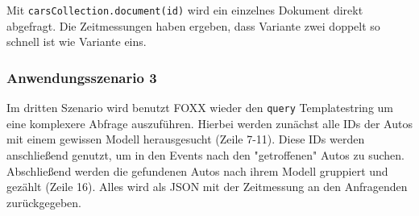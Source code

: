  Mit \texttt{carsCollection.document(id)} wird ein einzelnes Dokument direkt abgefragt. Die Zeitmessungen haben ergeben, dass Variante zwei doppelt so schnell ist wie Variante eins.

\subsubsection{Anwendungsszenario 3}
Im dritten Szenario wird benutzt FOXX wieder den \texttt{query} Templatestring um eine komplexere Abfrage auszuführen. Hierbei werden zunächst alle IDs der Autos mit einem gewissen Modell herausgesucht (Zeile 7-11). Diese IDs werden anschließend genutzt, um in den Events nach den "getroffenen" Autos zu suchen. Abschließend werden die gefundenen Autos nach ihrem Modell gruppiert und gezählt (Zeile 16). Alles wird als \ac{JSON} mit der Zeitmessung an den Anfragenden zurückgegeben.
